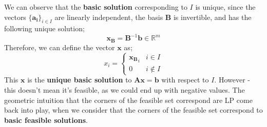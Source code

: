 \documentclass[a4paper, 12pt]{article}
\newcommand{\mat}[1]{\boldsymbol{#1}}
\renewcommand{\vec}[1]{\boldsymbol{#1}}
\begin{document}
            We can observe that the \textbf{basic solution} corresponding to $I$ is unique, since the vectors $\{\vec{a_i}\}_{i \in I}$ are linearly independent, the basis $\mat{B}$ is invertible, and has the following unique solution;
            $$\vec{x_B} = \mat{B}^{-1}\vec{b} \in \mathbb{R}^m$$
            Therefore, we can define the vector $\vec{x}$ as;
            $$x_i = \begin{cases}
                \vec{x_B}_i & i \in I \\
                0 & i \notin I
            \end{cases}$$
            This $\vec{x}$ is the \textbf{unique basic solution} to $\mat{A}\vec{x} = \vec{b}$ with respect to $I$.
            However - this doesn't mean it's feasible, as we could end up with negative values.
            The geometric intuition that the corners of the feasible set correspond are LP come back into play, when we consider that the corners of the feasible set correspond to \textbf{basic feasible solutions}.
            \medskip
\end{document}
